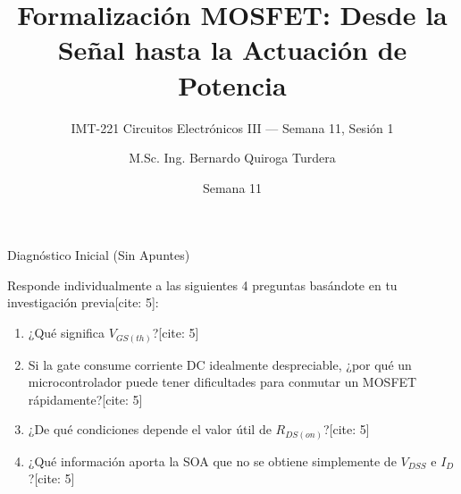 \documentclass[aspectratio=169, table]{beamer}
\title[Potencia y MOSFET]{Formalización MOSFET: Desde la Señal hasta la Actuación de Potencia}
\subtitle{IMT-221 Circuitos Electrónicos III — Semana 11, Sesión 1}
\author[B. Quiroga Turdera]{M.Sc. Ing. Bernardo Quiroga Turdera}
\institute[UCB Tarija]{Universidad Católica Boliviana ``San Pablo'' — Sede Tarija}
\date{Semana 11}
\begin{document}
\begin{frame}
    \titlepage
\end{frame}

\begin{frame}{Diagnóstico Inicial (Sin Apuntes)}
    \begin{tcolorbox}[colback=ucbblue!5, colframe=ucbblue, title=Verificación de Exposición Investigativa]
        Responde individualmente a las siguientes 4 preguntas basándote en tu investigación previa[cite: 5]:
    \end{tcolorbox}
    \begin{enumerate}
        \item ¿Qué significa $V_{GS(th)}$?[cite: 5]
        \item Si la gate consume corriente DC idealmente despreciable, ¿por qué un microcontrolador puede tener dificultades para conmutar un MOSFET rápidamente?[cite: 5]
        \item ¿De qué condiciones depende el valor útil de $R_{DS(on)}$?[cite: 5]
        \item ¿Qué información aporta la SOA que no se obtiene simplemente de $V_{DSS}$ e $I_D$?[cite: 5]
    \end{enumerate}
\end{frame}
\end{document}
